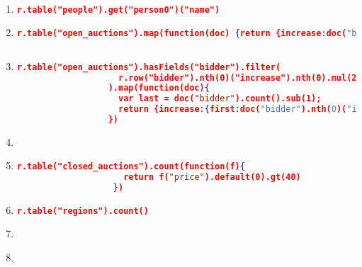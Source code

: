 \begin{enumerate}[label=Q\arabic*]
	\item \label{rethink-q-1}%
	
	\begin{lstlisting}[language=JSON, basicstyle=\scriptsize]
		r.table("people").get("person0")("name")
	\end{lstlisting}

	\item \label{rethink-q-2}%
	\begin{lstlisting}[language=JSON, basicstyle=\scriptsize]
	r.table("open_auctions").map(function(doc) {return {increase:doc("bidder").nth(0)("increase").nth(0).default("")}})
	
	\end{lstlisting}
	
    \item \label{rethink-q-3}%
	\begin{lstlisting}[language=JSON, basicstyle=\scriptsize]
	  r.table("open_auctions").hasFields("bidder").filter(
	                r.row("bidder").nth(0)("increase").nth(0).mul(2).le(r.row("bidder").nth(r.row("bidder").count().sub(1))("increase").nth(0))
	              ).map(function(doc){
	                var last = doc("bidder").count().sub(1);
	                return {increase:{first:doc("bidder").nth(0)("increase").nth(0), last:doc("bidder").nth(last)("increase").nth(0)} }
	              })
	\end{lstlisting}
	
	
    \item \label{rethink-q-4}%
	\par
	
	
    \item \label{rethink-q-5}%
	\begin{lstlisting}[language=JSON, basicstyle=\scriptsize]
	   r.table("closed_auctions").count(function(f){
	                 return f("price").default(0).gt(40)
	               })
	\end{lstlisting}
	
    \item \label{rethink-q-6}%
	\begin{lstlisting}[language=JSON, basicstyle=\scriptsize]
	   r.table("regions").count()
	\end{lstlisting}
	
	
    \item \label{rethink-q-7}%
    \par
	
	
    \item \label{rethink-q-8}%
	\par
	

\end{enumerate}
